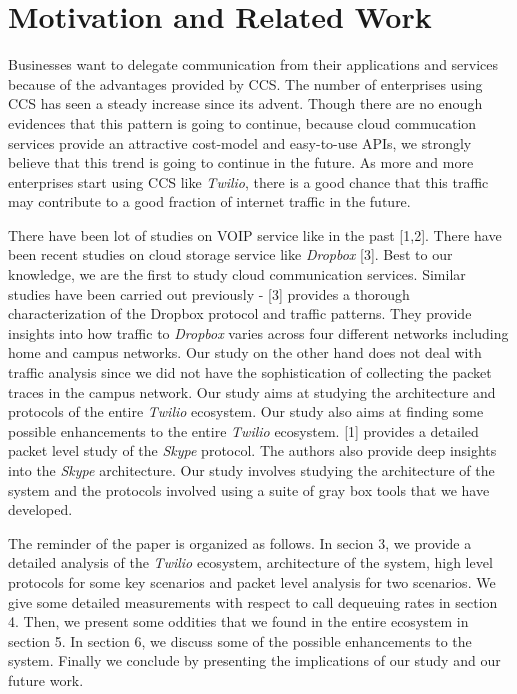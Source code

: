 \section{Motivation and Related Work}
\label{sec-motivationandrelated}
Businesses want to delegate communication from their applications and services because of the advantages provided by CCS. The number of enterprises using CCS has seen a steady increase since its advent. Though there are no enough evidences that this pattern is going to continue, because cloud commucation services provide an attractive cost-model and easy-to-use APIs, we strongly believe that this trend is going to continue in the future. As more and more enterprises start using CCS like \textit{Twilio}, there is a good chance that this traffic may contribute to a good fraction of internet traffic in the future. \par
There have been lot of studies on VOIP service like  in the past [1,2]. There have been recent studies on cloud storage service like \textit{Dropbox} [3]. Best to our knowledge, we are the first to study cloud communication services. Similar studies have been carried out previously - [3] provides a thorough characterization of the Dropbox protocol and traffic patterns. They provide insights into how traffic to \textit{Dropbox} varies across four different networks including home and campus networks. Our study on the other hand does not deal with traffic analysis since we did not have the sophistication of collecting the packet traces in the campus network. Our study aims at studying the architecture and protocols of the entire \textit{Twilio} ecosystem. Our study also aims at finding some possible enhancements to the entire \textit{Twilio} ecosystem. [1] provides a detailed packet level study of the \textit{Skype} protocol. The authors also provide deep insights into the \textit{Skype} architecture. Our study involves studying the architecture of the system and the protocols involved using a suite of gray box tools that we have developed. \par
The reminder of the paper is organized as follows. In secion 3, we provide a detailed analysis of the \textit{Twilio} ecosystem, architecture of the system, high level protocols for some key scenarios and packet level analysis for two scenarios. We give some detailed measurements with respect to call dequeuing rates in section 4. Then, we present some oddities that we found in the entire ecosystem in section 5. In section 6, we discuss some of the possible enhancements to the system. Finally we conclude by presenting the implications of our study and our future work.